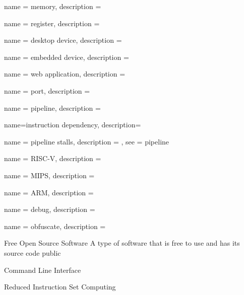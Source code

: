  {
  name = {memory},
  description = {}
}

 {
  name = {register},
  description = {}
}

 {
  name = {desktop device},
  description = {}
}

 {
  name = {embedded device},
  description = {}
}

 {
  name = {web application},
  description = {}
}

 {
  name = {port},
  description = {}
}

 {
  name = {pipeline},
  description = {}
}

 {
  name={instruction dependency},
  description={}
}

 {
  name = {pipeline stalls},
  description = {},
  see = {pipeline}
}

 {
  name = {RISC-V},
  description = {}
}

 {
  name = {MIPS},
  description = {}
}

 {
  name = {ARM},
  description = {}
}

 {
  name = {debug},
  description = {}
}

 {
  name = {obfuscate},
  description = {}
}


{Free Open Source Software}
{A type of software that is free to use and has its source code public}

{Command Line Interface}
{}

{Reduced Instruction Set Computing}
{}


